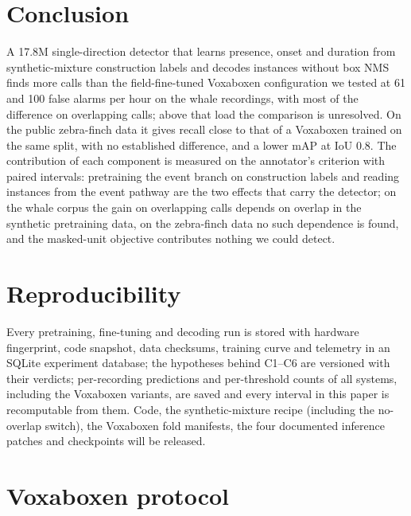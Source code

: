 \documentclass[10pt,twocolumn]{article}
\begin{document}
\section{Conclusion}
A 17.8M single-direction detector that learns presence, onset and duration from synthetic-mixture construction labels and decodes instances without box NMS finds more calls than the field-fine-tuned Voxaboxen configuration we tested at 61 and 100 false alarms per hour on the whale recordings, with most of the difference on overlapping calls; above that load the comparison is unresolved. On the public zebra-finch data it gives recall close to that of a Voxaboxen trained on the same split, with no established difference, and a lower mAP at IoU 0.8. The contribution of each component is measured on the annotator's criterion with paired intervals: pretraining the event branch on construction labels and reading instances from the event pathway are the two effects that carry the detector; on the whale corpus the gain on overlapping calls depends on overlap in the synthetic pretraining data, on the zebra-finch data no such dependence is found, and the masked-unit objective contributes nothing we could detect.

\section*{Reproducibility}
Every pretraining, fine-tuning and decoding run is stored with hardware fingerprint, code snapshot, data checksums, training curve and telemetry in an SQLite experiment database; the hypotheses behind C1--C6 are versioned with their verdicts; per-recording predictions and per-threshold counts of all systems, including the Voxaboxen variants, are saved and every interval in this paper is recomputable from them. Code, the synthetic-mixture recipe (including the no-overlap switch), the Voxaboxen fold manifests, the four documented inference patches and checkpoints will be released.

\appendix
\section{Voxaboxen protocol}
\label{app:vox}
\end{document}
